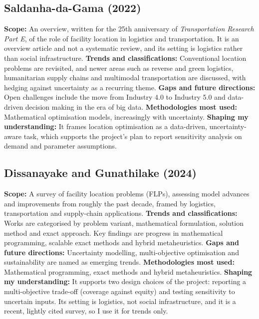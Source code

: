 \documentclass[journal]{IEEEtran}
\begin{document}
\subsection{Saldanha-da-Gama (2022) \cite{saldanha2022}}
\textbf{Scope:} An overview, written for the 25th anniversary of \emph{Transportation Research Part E}, of the role of facility location in logistics and transportation. It is an overview article and not a systematic review, and its setting is logistics rather than social infrastructure.
\textbf{Trends and classifications:} Conventional location problems are revisited, and newer areas such as reverse and green logistics, humanitarian supply chains and multimodal transportation are discussed, with hedging against uncertainty as a recurring theme.
\textbf{Gaps and future directions:} Open challenges include the move from Industry 4.0 to Industry 5.0 and data-driven decision making in the era of big data.
\textbf{Methodologies most used:} Mathematical optimisation models, increasingly with uncertainty.
\textbf{Shaping my understanding:} It frames location optimisation as a data-driven, uncertainty-aware task, which supports the project's plan to report sensitivity analysis on demand and parameter assumptions.

\subsection{Dissanayake and Gunathilake (2024) \cite{dissanayake2024}}
\textbf{Scope:} A survey of facility location problems (FLPs), assessing model advances and improvements from roughly the past decade, framed by logistics, transportation and supply-chain applications.
\textbf{Trends and classifications:} Works are categorised by problem variant, mathematical formulation, solution method and exact approach. Key findings are progress in mathematical programming, scalable exact methods and hybrid metaheuristics.
\textbf{Gaps and future directions:} Uncertainty modelling, multi-objective optimisation and sustainability are named as emerging trends.
\textbf{Methodologies most used:} Mathematical programming, exact methods and hybrid metaheuristics.
\textbf{Shaping my understanding:} It supports two design choices of the project: reporting a multi-objective trade-off (coverage against equity) and testing sensitivity to uncertain inputs. Its setting is logistics, not social infrastructure, and it is a recent, lightly cited survey, so I use it for trends only.
\end{document}
